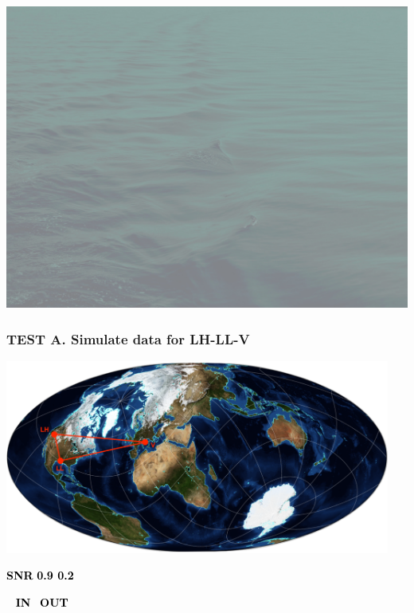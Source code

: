 \documentclass[handout]{beamer}
\begin{document}
{\usebackgroundtemplate%
{%
    \includegraphics[width=\paperwidth,height=\paperheight]{bklight.jpg}%
}
\begin{frame}
\frametitle{\textcolor{textcoldark}{TEST A. Simulate data for LH-LL-V}}
\centering
\includegraphics[width=0.95\textwidth]{3b}


\end{frame}

\begin{frame}[plain]
  \vskip 0.7cm
\begin{minipage}{0.061\textwidth}

\vskip -3cm
\textcolor{black}{\Large \bf SNR}
\centering
\large \textcolor{black}{\centering \bf  0.9
\vskip 2.7cm
\large \bf  0.2}\\
\vskip 2.5cm
\end{minipage}\qquad
\begin{minipage}{0.79\textwidth}
  \Large\qquad \,\,\,\quad\textcolor{black}{ \bf IN}\,\,\,\quad\qquad\qquad\qquad \textcolor{black}{ \bf OUT}
\medskip


\end{minipage}
\end{frame}}
\end{document}
